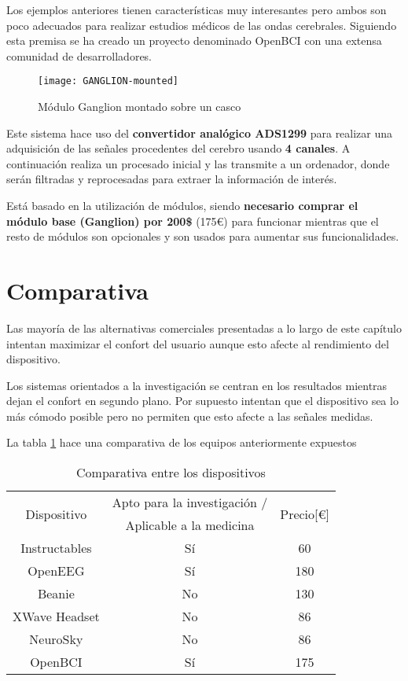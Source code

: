 Los ejemplos anteriores tienen características muy interesantes pero ambos son poco adecuados para realizar estudios médicos de las ondas cerebrales. Siguiendo esta premisa se ha creado un proyecto denominado OpenBCI con una extensa comunidad de desarrolladores.

\begin{figure} [H]
    \centering
    \texttt{[image: GANGLION-mounted]}
    \caption{Módulo Ganglion montado sobre un casco \cite{OpenBCI}}
    \label{fig:GANGLION-mounted}
\end{figure}

Este sistema hace uso del \textbf{convertidor analógico ADS1299} para realizar una adquisición de las señales procedentes del cerebro usando \textbf{4 canales}. A continuación realiza un procesado inicial y las transmite a un ordenador, donde serán filtradas y reprocesadas para extraer la información de interés.

Está basado en la utilización de módulos, siendo \textbf{necesario comprar el módulo base (Ganglion) por 200\$} (175€) para funcionar mientras que el resto de módulos son opcionales y son usados para aumentar sus funcionalidades.

\section{Comparativa\label{sec:EdA_comparativa}}

Las mayoría de las alternativas comerciales presentadas a lo largo de este capítulo intentan maximizar el confort del usuario aunque esto afecte al rendimiento del dispositivo. 

Los sistemas orientados a la investigación se centran en los resultados mientras dejan el confort en segundo plano. Por supuesto intentan que el dispositivo sea lo más cómodo posible pero no permiten que esto afecte a las señales medidas.

La tabla \ref{tab:EdA_Comparativa} hace una comparativa de los equipos anteriormente expuestos

\begin{table} [H]
\centering
\begin{tabular}{|c|c|c|}
\hline
\multirow{2}{*}{Dispositivo} 	& Apto para la investigación / 	& \multirow{2}{*}{Precio[€]} \\
 								& Aplicable a la medicina 		&  \\
\hline
Instructables & Sí\footnotemark{} & 60 \\
\hline
OpenEEG & Sí & 180 \\
\hline
Beanie & No & 130 \\
\hline
XWave Headset & No & 86 \\
\hline
NeuroSky & No & 86 \\
\hline
OpenBCI & Sí & 175 \\
\hline
\end{tabular}
\caption{Comparativa entre los dispositivos}
\label{tab:EdA_Comparativa}
\end{table}

